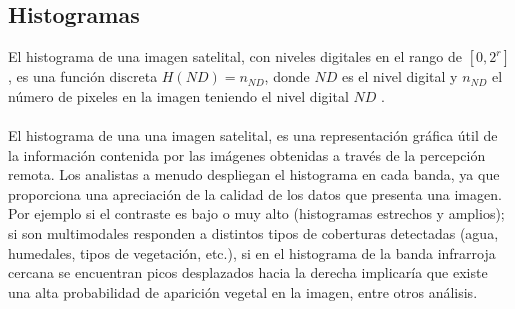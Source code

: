 \subsection{Histogramas}
El histograma de una imagen satelital, con niveles digitales en el rango de $ [0,2^{r}] $, es una funci\'on discreta $ H(ND)=n_{ND} $, donde $ ND $ es el nivel digital y $ n_{ND} $ el n\'umero de pixeles en la imagen teniendo el nivel digital $ ND $ \cite{gonzalez2002woods}.\\~\\
El histograma de una una imagen satelital, es una representaci\'on gr\'afica \'util de la informaci\'on contenida por las im\'agenes obtenidas a trav\'es de la percepci\'on remota. Los analistas a menudo despliegan el histograma en cada banda, ya que proporciona una apreciaci\'on de la calidad de los datos que presenta una imagen. Por ejemplo si el contraste es bajo o muy alto (histogramas estrechos y amplios); si son multimodales responden a distintos tipos de coberturas detectadas (agua, humedales, tipos de vegetaci\'on, etc.), si en  el histograma de la banda infrarroja cercana se encuentran picos desplazados hacia la derecha implicar\'ia que existe una alta probabilidad de aparici\'on vegetal en la imagen, entre otros an\'alisis.

